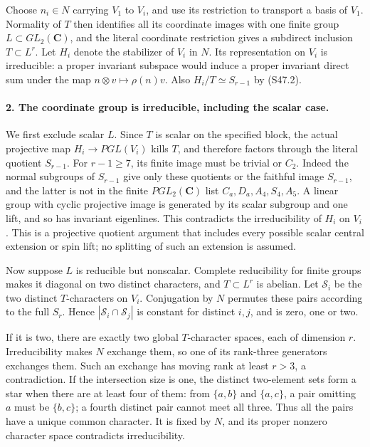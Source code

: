 Choose \(n_i\in N\) carrying \(V_1\) to \(V_i\), and
use its restriction to transport a basis of \(V_1\).
Normality of \(T\) then identifies all its coordinate images
with one finite group \(L\subset GL_2(\mathbf C)\), and
the literal coordinate restriction gives a subdirect inclusion
\(T\subset L^r\). Let \(H_i\) denote the stabilizer of
\(V_i\) in \(N\). Its representation on \(V_i\) is
irreducible: a proper invariant subspace would induce a
proper invariant direct sum under the map
\(n\otimes v\mapsto\rho(n)v\). Also
\(H_i/T\simeq S_{r-1}\) by (S47.2).

\paragraph{2. The coordinate group is irreducible, including the scalar case.}
We first exclude scalar \(L\). Since \(T\) is scalar
on the specified block, the actual projective map
\(H_i\to PGL(V_i)\) kills \(T\), and therefore factors
through the literal quotient \(S_{r-1}\). For \(r-1\ge7\),
its finite image must be trivial or \(C_2\). Indeed the
normal subgroups of \(S_{r-1}\) give only these quotients
or the faithful image \(S_{r-1}\), and the latter is not
in the finite \(PGL_2(\mathbf C)\) list
\(C_a,D_a,A_4,S_4,A_5\). A linear group with cyclic
projective image is generated by its scalar subgroup and
one lift, and so has invariant eigenlines. This contradicts
the irreducibility of \(H_i\) on \(V_i\).
This is a projective quotient argument that includes every
possible scalar central extension or spin lift; no splitting
of such an extension is assumed.

Now suppose \(L\) is reducible but nonscalar. Complete
reducibility for finite groups makes it diagonal on two
distinct characters, and \(T\subset L^r\) is abelian.
Let \(\mathcal S_i\) be the two distinct \(T\)-characters
on \(V_i\). Conjugation by \(N\) permutes these pairs
according to the full \(S_r\). Hence
\(|\mathcal S_i\cap\mathcal S_j|\) is constant for
distinct \(i,j\), and is zero, one or two.

If it is two, there are exactly two global \(T\)-character
spaces, each of dimension \(r\). Irreducibility makes
\(N\) exchange them, so one of its rank-three generators
exchanges them. Such an exchange has moving rank at least
\(r>3\), a contradiction.
If the intersection size is one, the distinct two-element
sets form a star when there are at least four of them:
from \(\{a,b\}\) and \(\{a,c\}\), a pair omitting
\(a\) must be \(\{b,c\}\); a fourth distinct pair
cannot meet all three. Thus all the pairs have a unique
common character. It is fixed by \(N\), and its proper
nonzero character space contradicts irreducibility.

